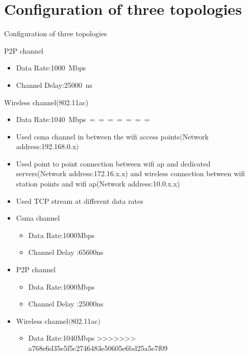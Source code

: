 \documentclass{beamer}
\begin{document}
\section{Configuration of three topologies}
\begin{frame}{Configuration of three topologies}
	\item P2P channel
	\begin{itemize}
		\item Data Rate:\SI{1000}Mbps
		\item Channel Delay:\SI{25000}{\nano\second}
	\end{itemize}
	\item Wireless channel\big(802.11ac\big)
	\begin{itemize}
		\item Data Rate:\SI{1040}Mbps
=======
	\item Used csma channel in between the wifi access points$($Network address:192.168.0.x$)$
	\item Used point to point connection between wifi ap and dedicated servers(Network address:172.16.x.x) and wireless connection between wifi station points and wifi ap(Network address:10.0.x.x)
	\item Used TCP stream at different data rates
	\item Csma channel
	\begin{itemize}
		\item Data Rate:1000Mbps
		\item Channel Delay :65600ns
	\end{itemize}
	\item P2P channel
	\begin{itemize}
		\item Data Rate:1000Mbps
		\item Channel Delay :25000ns
	\end{itemize}
	\item Wireless channel$($802.11ac$)$
	\begin{itemize}
		\item Data Rate:1040Mbps
>>>>>>> a768e6d35e5f5c2746483e50605e6bd25a5e7f09
	\end{itemize}
	
\end{itemize}
\end{frame}
\end{document}
